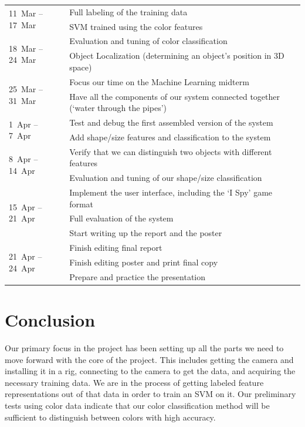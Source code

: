 \documentclass[11pt]{article}
\newcommand{\xxx}[1]{{\bf \color{red} #1}}
\newcommand\T{\rule{0pt}{3ex}}
\newcommand\B{\rule[-1.2ex]{0pt}{0pt}}
\begin{document}
\begin{center}
    \begin{tabular}{ | l | l |}
    \hline
    \multirow{2}{*}{11~Mar -- 17~Mar}
	& Full labeling of the training data \T \\
	& SVM trained using the color features \B \\
    \hline
    \multirow{2}{*}{18~Mar -- 24~Mar}
	& Evaluation and tuning of color classification \T \\
	& Object Localization (determining an object's position in 3D space) \B \\
    \hline
    \multirow{2}{*}{25~Mar -- 31~Mar}
	& Focus our time on the Machine Learning midterm \T\\
	& Have all the components of our system connected together (`water through the pipes') \B \\
    \hline
    \multirow{2}{*}{1~Apr -- 7~Apr}
	& Test and debug the first assembled version of the system \T \\
	& Add shape/size features and classification to the system \B\\
    \hline
    \multirow{2}{*}{8~Apr -- 14~Apr}
	& Verify that we can distinguish two objects with different features \T\\
	& Evaluation and tuning of our shape/size classification \B \\
    \hline
    \multirow{3}{*}{15~Apr -- 21~Apr}
	& Implement the user interface, including the `I Spy' game format \T\\
	& Full evaluation of the system \\
	& Start writing up the report and the poster \B \\
    \hline
    \multirow{3}{*}{21~Apr -- 24~Apr}
	& Finish editing final report \T \\
	& Finish editing poster and print final copy \\
	& Prepare and practice the presentation \B \\
    \hline
    \end{tabular}
\end{center}

\section{Conclusion}
Our primary focus in the project has been setting up all the parts we need to move forward with the core of the project. This includes getting the camera and installing it in a rig, connecting to the camera to get the data, and acquiring the necessary training data. We are in the process of getting labeled feature representations out of that data in order to train an SVM on it. Our preliminary tests using color data indicate that our color classification method will be sufficient to distinguish between colors with high accuracy.
\end{document}

